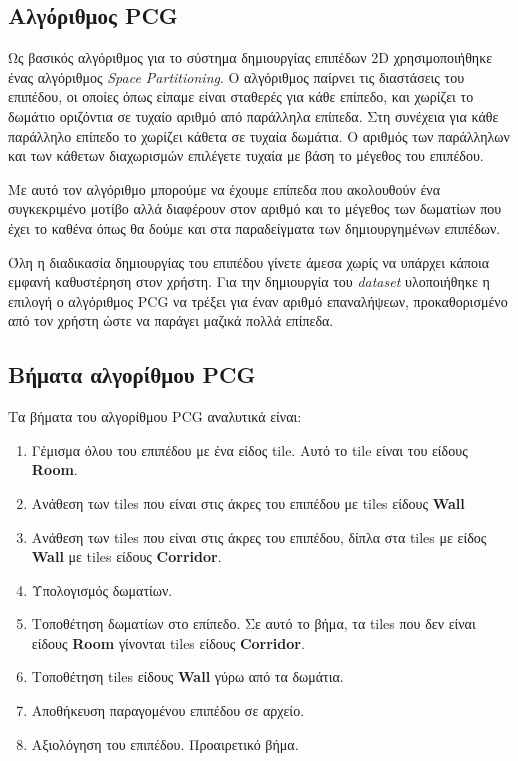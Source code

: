 \subsection{Αλγόριθμος PCG}
Ως βασικός αλγόριθμος για το σύστημα δημιουργίας επιπέδων 2D χρησιμοποιήθηκε ένας αλγόριθμος \textit{Space Partitioning}. O αλγόριθμος παίρνει τις διαστάσεις του επιπέδου, οι οποίες όπως είπαμε είναι σταθερές για κάθε επίπεδο, και χωρίζει το δωμάτιο οριζόντια σε τυχαίο αριθμό από παράλληλα επίπεδα. Στη συνέχεια για κάθε παράλληλο επίπεδο το χωρίζει κάθετα σε τυχαία δωμάτια. Ο αριθμός των παράλληλων και των κάθετων διαχωρισμών επιλέγετε τυχαία με βάση το μέγεθος του επιπέδου.
\par
Με αυτό τον αλγόριθμο μπορούμε να έχουμε επίπεδα που ακολουθούν ένα συγκεκριμένο μοτίβο αλλά διαφέρουν στον αριθμό και το μέγεθος των δωματίων που έχει το καθένα όπως θα δούμε και στα παραδείγματα των δημιουργημένων επιπέδων.
\par
Όλη η διαδικασία δημιουργίας του επιπέδου γίνετε άμεσα χωρίς να υπάρχει κάποια εμφανή καθυστέρηση στον χρήστη. Για την δημιουργία του \textit{dataset} υλοποιήθηκε η επιλογή ο αλγόριθμος PCG να τρέξει για έναν αριθμό επαναλήψεων, προκαθορισμένο από τον χρήστη ώστε να παράγει μαζικά πολλά επίπεδα.

\subsection{Βήματα αλγορίθμου PCG}
Τα βήματα του αλγορίθμου PCG αναλυτικά είναι:

\begin{enumerate}
	\item Γέμισμα όλου του επιπέδου με ένα είδος tile. Αυτό το tile είναι του είδους \textbf{Room}.
	\item Ανάθεση των tiles που είναι στις άκρες του επιπέδου με tiles είδους \textbf{Wall}
	\item Ανάθεση των tiles που είναι στις άκρες του επιπέδου, δίπλα στα tiles με είδος \textbf{Wall} με tiles είδους \textbf{Corridor}.
	\item Υπολογισμός δωματίων.
	\item Τοποθέτηση δωματίων στο επίπεδο. Σε αυτό το βήμα, τα tiles που δεν είναι είδους \textbf{Room} γίνονται tiles είδους \textbf{Corridor}.
	\item Τοποθέτηση tiles είδους \textbf{Wall} γύρω από τα δωμάτια.
	\item Αποθήκευση παραγομένου επιπέδου σε αρχείο.
	\item Αξιολόγηση του επιπέδου. Προαιρετικό βήμα.
\end{enumerate}



